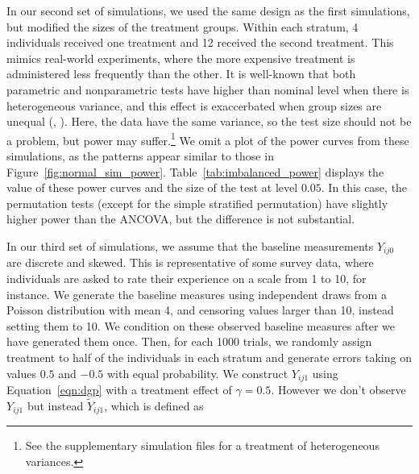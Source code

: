 \documentclass[11pt]{article}
\begin{document}
In our second set of simulations, we used the same design as the first simulations, but modified the sizes of the treatment groups.
Within each stratum, 4 individuals received one treatment and 12 received the second treatment.
This mimics real-world experiments, where the more expensive treatment is administered less frequently than the other.
It is well-known that both parametric and nonparametric tests have higher than nominal level when there is heterogeneous variance, and this effect is exaccerbated when group sizes are unequal (\cite{glass_consequences_1972}, \cite{zimmerman_two_2006}).
Here, the data have the same variance, so the test size should not be a problem, but power may suffer.\footnote{
See the supplementary simulation files for a treatment of heterogeneous variances.}
We omit a plot of the power curves from these simulations, as the patterns appear similar to those in Figure~\ref{fig:normal_sim_power}.
Table~\ref{tab:imbalanced_power} displays the value of these power curves and the size of the test at level $0.05$.
In this case, the permutation tests (except for the simple stratified permutation) have slightly higher power than the ANCOVA, but the difference is not substantial.
\begin{center}

\end{center}



In our third set of simulations, we assume that the baseline measurements $Y_{ij0}$ are discrete and skewed.
This is representative of some survey data, where individuals are asked to rate their experience on a scale from 1 to 10, for instance.
We generate the baseline measures using independent draws from a Poisson distribution with mean 4, and censoring values larger than 10, instead setting them to 10.
We condition on these observed baseline measures after we have generated them once.
Then, for each 1000 trials, we randomly assign treatment to half of the individuals in each stratum and generate errors taking on values $0.5$ and $-0.5$ with equal probability.
We construct $Y_{ij1}$ using Equation~\ref{eqn:dgp} with a treatment effect of $\gamma = 0.5$.
However we don't observe $Y_{ij1}$ but instead $\tilde{Y}_{ij1}$, which is defined as 
\end{document}

